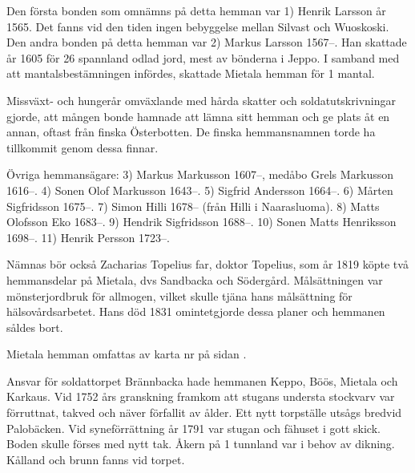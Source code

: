%

Den första bonden som omnämns på detta hemman var 1) Henrik Larsson år 1565. Det fanns vid den tiden ingen bebyggelse mellan Silvast och Wuoskoski. Den andra bonden på detta hemman var 2) Markus Larsson 1567--. Han skattade år 1605 för 26 spannland odlad jord, mest av bönderna i Jeppo. I samband med att mantalsbestämningen infördes, skattade Mietala hemman för 1 mantal.

Missväxt- och hungerår omväxlande med hårda skatter och soldatutskrivningar gjorde, att mången bonde hamnade att lämna sitt hemman och ge plats åt en annan, oftast från finska Österbotten. De finska hemmansnamnen torde ha tillkommit genom dessa finnar.

Övriga hemmansägare:  3) Markus Markusson 1607--, medåbo Grels Markusson 1616--. 4) Sonen Olof Markusson 1643--. 5) Sigfrid Andersson 1664--. 6) Mårten Sigfridsson 1675--. 7) Simon Hilli 1678-- (från Hilli i Naarasluoma). 8) Matts Olofsson Eko 1683--. 9) Hendrik Sigfridsson 1688--. 10) Sonen Matts Henriksson 1698--. 11) Henrik Persson 1723--.

Nämnas bör också  Zacharias Topelius far, doktor Topelius, som år 1819 köpte två hemmansdelar på Mietala, dvs Sandbacka och Södergård. Målsättningen var mönsterjordbruk för allmogen, vilket skulle tjäna hans målsättning för hälsovårdsarbetet. Hans död 1831 omintetgjorde dessa planer och hemmanen såldes bort.


Mietala hemman omfattas av karta nr  på sidan \pageref{map:17}.




%



%

\jhnooccupant{}

Ansvar för soldattorpet Brännbacka hade hemmanen Keppo, Böös, Mietala och Karkaus. Vid 1752 års granskning framkom att stugans understa stockvarv var förruttnat, takved och näver förfallit av ålder. Ett nytt torpställe utsågs bredvid Palobäcken. Vid syneförrättning år 1791 var stugan och fähuset i gott skick. Boden skulle förses med nytt tak. Åkern på 1 tunnland var i behov av dikning. Kålland och brunn fanns vid torpet.

